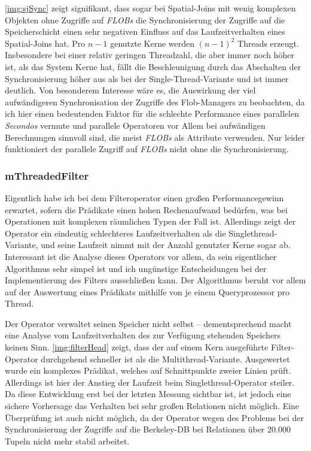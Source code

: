 \documentclass[a4paper,12pt,twoside]{article}
\newcommand{\Fb}[1]{\textit{#1}} %
\begin{document}
\autoref{img:sjSync} zeigt signifikant, dass sogar bei Spatial-Joins mit wenig komplexen Objekten ohne Zugriffe auf \Fb{FLOBs} die Synchronisierung der Zugriffe auf die Speicherschicht einen sehr negativen Einfluss auf das Laufzeitverhalten eines Spatial-Joins hat. Pro $n-1$ genutzte Kerne werden $(n-1)^2$ Threads erzeugt. Insbesondere bei einer relativ geringen Threadzahl, die aber immer noch höher ist, als das System Kerne hat, fällt die Beschleunigung durch das Abschalten der Synchronisierung höher aus als bei der Single-Thread-Variante und ist immer deutlich. Von besonderem Interesse wäre es, die Auswirkung der viel aufwändigeren Synchronisation der Zugriffe des Flob-Managers zu beobachten, da ich hier einen bedeutenden Faktor für die schlechte Performance eines parallelen \Fb{Secondos} vermute und parallele Operatoren vor Allem bei aufwändigen Berechnungen sinnvoll sind, die meist \Fb{FLOBs} als Attribute verwenden. Nur leider funktioniert der parallele Zugriff auf \Fb{FLOBs} nicht ohne die Synchronisierung.   

\subsubsection{mThreadedFilter}
\label{entw:filter}

Eigentlich habe ich bei dem Filteroperator einen großen Performancegewinn erwartet, sofern die Prädikate einen hohen Rechenaufwand bedürfen, was bei Operationen mit komplexen räumlichen Typen der Fall ist. Allerdings zeigt der Operator ein eindeutig schlechteres Laufzeitverhalten als die Singlethread-Variante, und seine Laufzeit nimmt mit der Anzahl genutzter Kerne sogar ab. Interessant ist die Analyse dieses Operators vor allem, da sein eigentlicher Algorithmus sehr simpel ist und ich ungünstige Entscheidungen bei der Implementierung des Filters ausschließen kann. Der Algorithmus beruht vor allem auf der Auswertung eines Prädikats mithilfe von je einem Queryprozessor pro Thread.
  
Der Operator verwaltet seinen Speicher nicht selbst -- dementsprechend macht eine Analyse vom Laufzeitverhalten des zur Verfügung stehenden Speichers keinen Sinn. \autoref{img:filterHead} zeigt, dass der auf einem Kern ausgeführte Filter-Operator durchgehend schneller ist als die Multithread-Variante. Ausgewertet wurde ein komplexes Prädikat, welches auf Schnittpunkte zweier Linien prüft. Allerdings ist hier der Anstieg der Laufzeit beim Singlethread-Operator steiler. Da diese Entwicklung erst bei der letzten Messung sichtbar ist, ist jedoch eine sichere Vorhersage das Verhalten bei sehr großen Relationen nicht möglich. Eine Überprüfung ist auch nicht möglich, da der Operator wegen des Problems bei der Synchronisierung der Zugriffe auf die Berkeley-DB bei Relationen über 20.000 Tupeln nicht mehr stabil arbeitet. 
\end{document}
